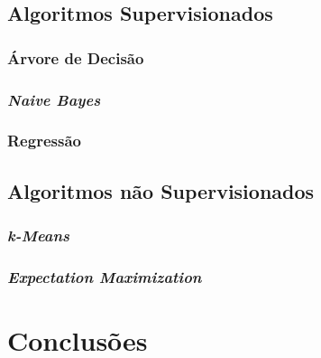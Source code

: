 \documentclass{article}
\begin{document}
\subsection{Algoritmos Supervisionados}

\subsubsection{Árvore de Decisão}

\subsubsection{{\b \it Naive Bayes}}

\subsubsection{Regressão}

\subsection{Algoritmos não Supervisionados}

\subsubsection{{\b \it k-Means}}

\subsubsection{{\b \it Expectation Maximization}}

\section{Conclusões}



\end{document}
